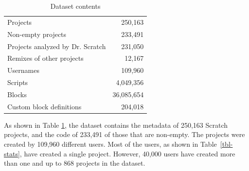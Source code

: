\documentclass[10pt, conference]{IEEEtran}
\begin{document}

\begin{table}[]
	\centering
	\begin{tabular}{lr}
		\hline
		Projects & 250,163 \\
		Non-empty projects & 233,491 \\
		Projects analyzed by Dr. Scratch & 231,050 \\
		Remixes of other projects & 12,167 \\
		Usernames & 109,960 \\
		Scripts & 4,049,356 \\
		Blocks & 36,085,654 \\
		Custom block definitions & 204,018 \\
		\hline
	\end{tabular}
	\caption{Dataset contents}
	\label{tbl-size}
\end{table}

As shown in Table \ref{tbl-size}, the dataset contains the metadata of 250,163 Scratch projects, and the code of 233,491 of those that are non-empty.
The projects were created by 109,960 different users.
Most of the users, as shown in Table~\ref{tbl-stats}, have created a single project.
However, 40,000 users have created more than one and up to 868 projects in the dataset.
\end{document}
